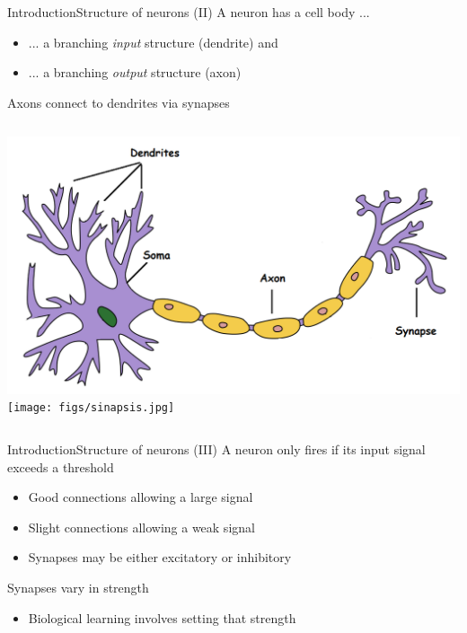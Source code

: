 \documentclass[10pt,compress]{beamer} %
\begin{document}
\begin{frame}{Introduction}{Structure of neurons (II)}
	A neuron has a cell body ...
		\begin{itemize}
			\item ... a branching \textit{input} structure (dendrite) and 
			\item ... a branching \textit{output} structure (axon)
		\end{itemize}
	Axons connect to dendrites via \alert{synapses}

	\bigskip

	\begin{columns}[c]
			\includegraphics[width=\linewidth]{figs/neuron-bio.png}
			\texttt{[image: figs/sinapsis.jpg]}
    \end{columns}
\end{frame}

\begin{frame}{Introduction}{Structure of neurons (III)}
	A neuron only fires if its input signal exceeds a threshold
	\begin{itemize}
	\item Good connections allowing a large signal
	\item Slight connections allowing a weak signal
	\item Synapses may be either excitatory or inhibitory
	\end{itemize}
	Synapses vary in strength
	\begin{itemize}
		\item Biological learning involves setting that strength
	\end{itemize}
\end{frame}
\end{document}
